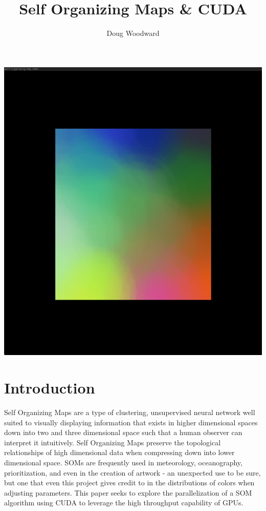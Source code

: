 \documentclass[11pt]{article}
\title{\textbf{Self Organizing Maps \& CUDA}}
\author{Doug Woodward}
\date{}
\begin{document}
\maketitle
\begin{center}
\includegraphics[scale=.15]{title}
\end{center}
\section{Introduction}

Self Organizing Maps are a type of clustering, unsupervised neural network well suited to visually displaying information that exists in higher dimensional spaces down into two and three dimensional space such that a human observer can interpret it intuitively. Self Organizing Maps preserve the topological relationships of high dimensional data when compressing down into lower dimensional space. SOMs are frequently used in meteorology, oceanography, prioritization, and even in the creation of artwork - an unexpected use to be sure, but one that even this project gives credit to in the distributions of colors when adjusting parameters. This paper seeks to explore the parallelization of a SOM algorithm using CUDA to leverage the high throughput capability of GPUs.
\end{document}
